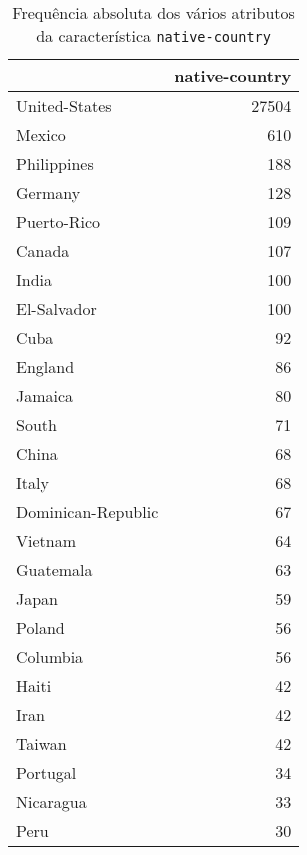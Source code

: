 \begin{table}
\centering
\caption{Frequência absoluta dos vários atributos da característica \texttt{native-country}}
\begin{tabular}{lr}
\toprule
{} &  native-country \\
\midrule
 United-States              &           27504 \\
 Mexico                     &             610 \\
 Philippines                &             188 \\
 Germany                    &             128 \\
 Puerto-Rico                &             109 \\
 Canada                     &             107 \\
 India                      &             100 \\
 El-Salvador                &             100 \\
 Cuba                       &              92 \\
 England                    &              86 \\
 Jamaica                    &              80 \\
 South                      &              71 \\
 China                      &              68 \\
 Italy                      &              68 \\
 Dominican-Republic         &              67 \\
 Vietnam                    &              64 \\
 Guatemala                  &              63 \\
 Japan                      &              59 \\
 Poland                     &              56 \\
 Columbia                   &              56 \\
 Haiti                      &              42 \\
 Iran                       &              42 \\
 Taiwan                     &              42 \\
 Portugal                   &              34 \\
 Nicaragua                  &              33 \\
 Peru                       &              30 \\

\end{tabular}
\end{table}
